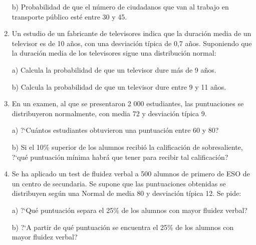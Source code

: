 \begin{adjustwidth}{20pt}{10pt}
\begin{enumerate}[PB. 1. ]
b) Probabilidad de que el número de ciudadanos que van al trabajo en transporte público esté entre 30 y 45.
		
		\hspace{-1cm}\vspace{1cm}
		
		\item 	Un estudio de un fabricante de televisores indica que la duración media de un televisor es de 10 años, con una desviación típica de 0,7 años. Suponiendo que la duración media de los televisores sigue una distribución normal:

a) Calcula la probabilidad de que un televisor dure más de 9 años.

b) Calcula la probabilidad de que un televisor dure entre 9 y 11 años.
		
		\hspace{-1cm}\vspace{1cm}
		
		\item 	En un examen, al que se presentaron 2 000 estudiantes, las puntuaciones se distribuyeron normalmente, con media 72 y desviación típica 9.
		 
a) ?`Cuántos estudiantes obtuvieron una puntuación entre 60 y 80?

b) Si el 10\% superior de los alumnos recibió la calificación de sobresaliente, ?`qué puntuación mínima habrá que tener para recibir tal calificación?

		\hspace{-1cm}\vspace{1cm}
		
		\item 	Se ha aplicado un test de fluidez verbal a 500 alumnos de primero de ESO de un centro de secundaria. Se supone que las puntuaciones obtenidas se distribuyen según una Normal de media 80 y desviación típica 12. Se pide:
		
a) ?`Qué puntuación separa el 25\% de los alumnos con mayor fluidez verbal?

b) ?`A partir de qué puntuación se encuentra el 25\% de los alumnos con mayor fluidez verbal?

		\hspace{-1cm}\vspace{1cm}
		

\end{enumerate}
\end{adjustwidth}
